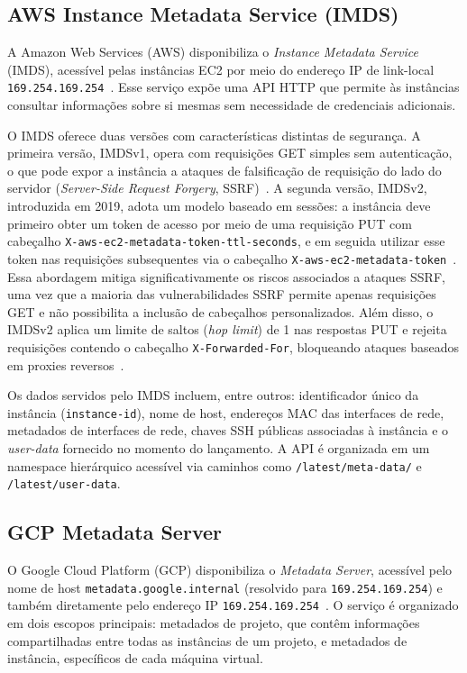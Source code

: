 \subsection{AWS Instance Metadata Service (IMDS)}

A Amazon Web Services (AWS) disponibiliza o \textit{Instance Metadata Service} (IMDS), acessível pelas instâncias EC2 por meio do endereço IP de link-local \texttt{169.254.169.254}~\citep{aws_imds}. Esse serviço expõe uma API HTTP que permite às instâncias consultar informações sobre si mesmas sem necessidade de credenciais adicionais.

O IMDS oferece duas versões com características distintas de segurança. A primeira versão, IMDSv1, opera com requisições GET simples sem autenticação, o que pode expor a instância a ataques de falsificação de requisição do lado do servidor (\textit{Server-Side Request Forgery}, SSRF)~\citep{mitre_t1552_005}. A segunda versão, IMDSv2, introduzida em 2019, adota um modelo baseado em sessões: a instância deve primeiro obter um token de acesso por meio de uma requisição PUT com cabeçalho \texttt{X-aws-ec2-metadata-token-ttl-seconds}, e em seguida utilizar esse token nas requisições subsequentes via o cabeçalho \texttt{X-aws-ec2-metadata-token}~\citep{aws_imdsv2}. Essa abordagem mitiga significativamente os riscos associados a ataques SSRF, uma vez que a maioria das vulnerabilidades SSRF permite apenas requisições GET e não possibilita a inclusão de cabeçalhos personalizados. Além disso, o IMDSv2 aplica um limite de saltos (\textit{hop limit}) de 1 nas respostas PUT e rejeita requisições contendo o cabeçalho \texttt{X-Forwarded-For}, bloqueando ataques baseados em proxies reversos~\citep{aws_imdsv2_blog}.

Os dados servidos pelo IMDS incluem, entre outros: identificador único da instância (\texttt{instance-id}), nome de host, endereços MAC das interfaces de rede, metadados de interfaces de rede, chaves SSH públicas associadas à instância e o \textit{user-data} fornecido no momento do lançamento. A API é organizada em um namespace hierárquico acessível via caminhos como \texttt{/latest/meta-data/} e \texttt{/latest/user-data}.

\subsection{GCP Metadata Server}

O Google Cloud Platform (GCP) disponibiliza o \textit{Metadata Server}, acessível pelo nome de host \texttt{metadata.google.internal} (resolvido para \texttt{169.254.169.254}) e também diretamente pelo endereço IP \texttt{169.254.169.254}~\citep{gcp_metadata}. O serviço é organizado em dois escopos principais: metadados de projeto, que contêm informações compartilhadas entre todas as instâncias de um projeto, e metadados de instância, específicos de cada máquina virtual.

